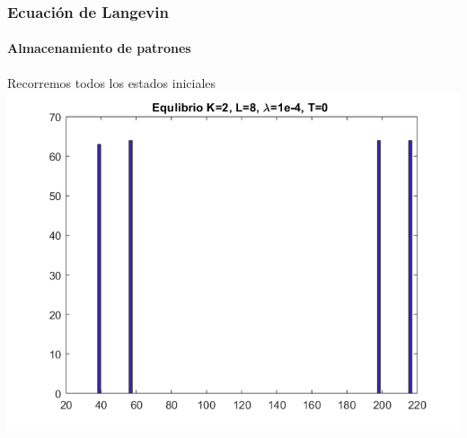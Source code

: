 \documentclass[11pt]{beamer}
\begin{document}
\begin{frame}
\frametitle{Ecuación de Langevin}
\framesubtitle{Almacenamiento de patrones}

 Recorremos todos los estados iniciales
	\includegraphics[scale=0.5]{k2l8t0}


\end{frame}
\end{document}

